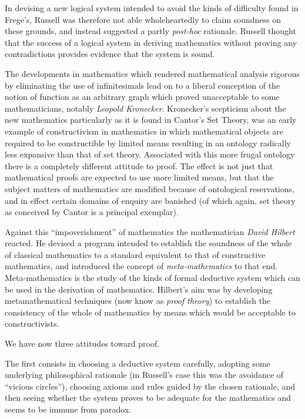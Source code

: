 In devising a new logical system intended to avoid the kinds of
difficulty found in Frege's, Russell was therefore not able
wholeheartedly to claim soundness on these grounds, and instead
suggested a partly \emph{post-hoc} rationale.
Russell thought that the success of a logical system in deriving
mathematics without proving any contradictions provides evidence that
the system is sound.

The developments in mathematics which rendered mathematical analysis
rigorous by eliminating the use of infinitesimals lead on to a liberal
conception of the notion of function as an arbitrary graph which
proved unacceptable to some mathematicians, notably \emph{Leopold
  Kronecker}.
Kronecker's scepticism about the new mathematics particularly as it is
found in Cantor's Set Theory, was an early example of constructivism
in mathematics in which mathematical objects are required to be
constructible by limited means resulting in an ontology radically less
expansive than that of set theory.
Associated with this more frugal ontology there is a completely
different attitude to proof.
The effect is not just that mathematical proofs are expected to use
more limited means, but that the subject matters of mathematics are
modified because of ontological reservations, and in effect certain
domains of enquiry are banished (of which again, set theory as
conceived by Cantor is a principal exemplar).

Against this ``impoverishment'' of mathematics the mathematician
\emph{David Hilbert} reacted.
He devised a program intended to establish the soundness of the
whole of classical mathematics to a standard equivalent to that of
constructive mathematics, and introduced the concept of
\emph{meta-mathematics} to that end.
Meta-mathematics is the study of the kinds of formal deductive system
which can be used in the derivation of mathematics.
Hilbert's aim was by developing metamathematical techniques (now know
as \emph{proof theory}) to establish the consistency of the whole of
mathematics by means which would be acceptable to constructivists.

We have now three attitudes toward proof.

The first consists in choosing a deductive system carefully, adopting
some underlying philosophical rationale (in Russell's case this was
the avoidance of ``vicious circles''), choosing axioms and rules guided
by the chosen rationale, and then seeing whether the system proves to
be adequate for the mathematics and seems to be immune from paradox.

